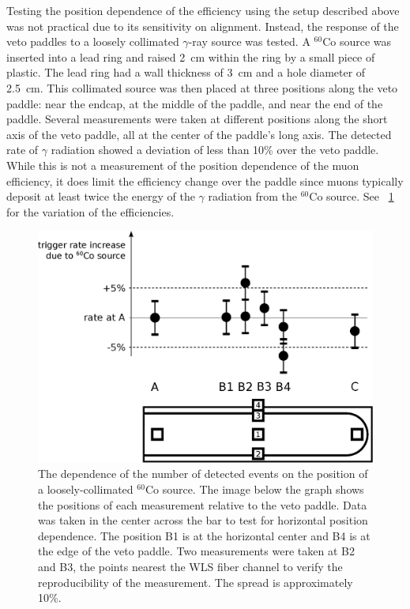 Testing the position dependence of the efficiency using the setup described above was not practical due to its sensitivity on alignment.  Instead, the response of the veto paddles to a loosely collimated $\gamma$-ray source was tested.  A $^{60}$Co source was inserted into a lead ring and raised 2~cm within the ring by a small piece of plastic.  The lead ring had a wall thickness of 3~cm and a hole diameter of 2.5~cm.  This collimated source was then placed at three positions along the veto paddle: near the endcap, at the middle of the paddle, and near the end of the paddle.  Several measurements were taken at different positions along the short axis of the veto paddle, all at the center of the paddle's long axis. The detected rate of $\gamma$ radiation showed a deviation of less than 10\% over the veto paddle.  While this is not a measurement of the position dependence of the muon efficiency, it does limit the efficiency change over the paddle since muons typically deposit at least twice the energy of the $\gamma$ radiation from the $^{60}$Co source.  See {\fig}~\ref{fig:positionDependence} for the variation of the efficiencies.
\begin{figure}[!htbp]
\centering
\includegraphics[width=1.0\textwidth]{figures/efficiency_positionDependence.eps}
\caption[Position sensitivity of the veto paddles.]{The dependence of the number of detected events on the position of a loosely-collimated $^{60}$Co source.  The image below the graph shows the positions of each measurement relative to the veto paddle.  Data was taken in the center across the bar to test for horizontal position dependence.  The position B1 is at the horizontal center and B4 is at the edge of the veto paddle.  Two measurements were taken at B2 and B3, the points nearest the WLS fiber channel to verify the reproducibility of the measurement.  The spread is approximately 10\%.}
\label{fig:positionDependence}
\end{figure}


